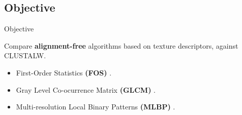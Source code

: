 \documentclass[10pt]{beamer}
\newcommand{\1}{
	\setbeamertemplate{background}{
		\texttt{[image: img/1]}
		\tikz[overlay] \fill[fill opacity=0.75,fill=white] (0,0) rectangle (-\paperwidth,\paperheight);
	}
}
\begin{document}
\subsection{Objective}

\begin{frame}{Objective}{}
	\begin{block}{}
		Compare  \textbf{alignment-free} algorithms based on texture descriptors, against CLUSTALW. 
		\begin{itemize}
			\item First-Order Statistics  \textbf{(FOS)} \cite{delibacs2020dna}.
			\item Gray Level Co-ocurrence Matrix \textbf{(GLCM)} \cite{chen2018use}.
			\item Multi-resolution Local Binary Patterns \textbf{(MLBP)} \cite{kouchaki2019signal}.
		\end{itemize}
	\end{block}

\end{frame}


\end{document}
